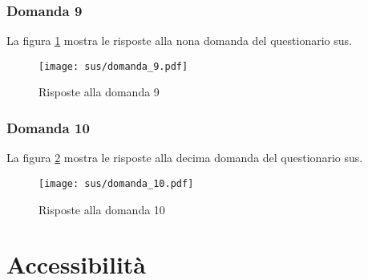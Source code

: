 \subsubsection*{Domanda 9}

\vspace{5pt}
\begin{minipage}{\textwidth}
  \par\noindent La figura \ref{fig:sus_q9} mostra le risposte alla nona domanda del questionario \gls{sus}.
  \begin{figure}[H]
    \centering
    \texttt{[image: sus/domanda\_9.pdf]}
    \caption{Risposte alla domanda 9}
    \label{fig:sus_q9}
  \end{figure}
\end{minipage}

\subsubsection*{Domanda 10}

\vspace{5pt}
\begin{minipage}{\textwidth}
  \par\noindent La figura \ref{fig:sus_q10} mostra le risposte alla decima domanda del questionario \gls{sus}.
  \begin{figure}[H]
    \centering
    \texttt{[image: sus/domanda\_10.pdf]}
    \caption{Risposte alla domanda 10}
    \label{fig:sus_q10}
  \end{figure}
\end{minipage}

\newpage

\section{Accessibilità}

